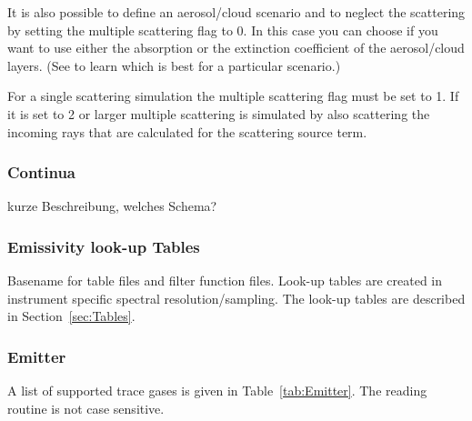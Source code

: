 It is also possible to define an aerosol/cloud scenario and to neglect the scattering by setting the multiple scattering flag to 0. In this case you can choose if you want to use either the absorption or the extinction coefficient of the aerosol/cloud layers. (See \citet{Hoepfner2005} to learn which is best for a particular scenario.)

For a single scattering simulation the multiple scattering flag must be set to 1. If it is set to 2 or larger multiple scattering is simulated by also scattering the incoming rays that are calculated for the scattering source term.

\subsubsection{Continua}
\todo kurze Beschreibung, welches Schema?

\subsubsection{Emissivity look-up Tables}
Basename for table files and filter function files. Look-up tables are created in instrument specific spectral resolution/sampling. The look-up tables are described in Section~\ref{sec:Tables}.

\subsubsection{Emitter}
\label{sec:Emitter}
A list of supported trace gases is given in Table~\ref{tab:Emitter}. The reading routine is not case sensitive.

